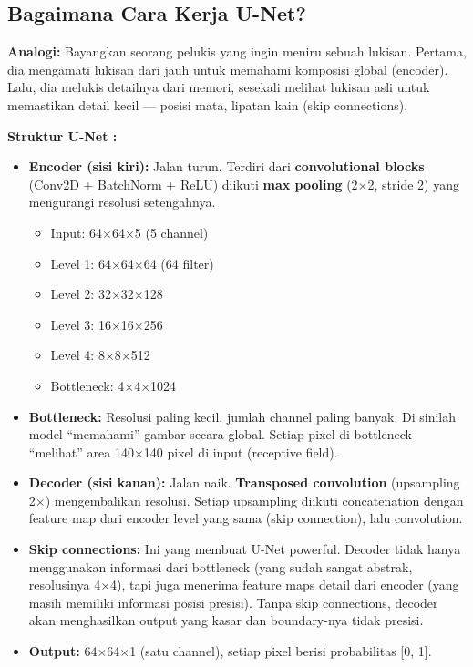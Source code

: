 \documentclass[10pt,a4paper,onecolumn]{article}
\begin{document}
\subsection{Bagaimana Cara Kerja U-Net?}

\textbf{Analogi:} Bayangkan seorang pelukis yang ingin meniru sebuah
lukisan. Pertama, dia mengamati lukisan dari jauh untuk memahami
komposisi global (encoder). Lalu, dia melukis detailnya dari memori,
sesekali melihat lukisan asli untuk memastikan detail kecil — posisi
mata, lipatan kain (skip connections).

\textbf{Struktur U-Net \cite{ronneberger2015unet}:}

\begin{itemize}[nosep]
    \item \textbf{Encoder (sisi kiri):} Jalan turun. Terdiri dari
          \textbf{convolutional blocks} (Conv2D + BatchNorm + ReLU)
          diikuti \textbf{max pooling} (2$\times$2, stride 2) yang
          mengurangi resolusi setengahnya.
    \begin{itemize}[nosep]
        \item Input: 64$\times$64$\times$5 (5 channel)
        \item Level 1: 64$\times$64$\times$64 (64 filter)
        \item Level 2: 32$\times$32$\times$128
        \item Level 3: 16$\times$16$\times$256
        \item Level 4: 8$\times$8$\times$512
        \item Bottleneck: 4$\times$4$\times$1024
    \end{itemize}
    \item \textbf{Bottleneck:} Resolusi paling kecil, jumlah channel
          paling banyak. Di sinilah model ``memahami'' gambar secara
          global. Setiap pixel di bottleneck ``melihat'' area
          140$\times$140 pixel di input (receptive field).
    \item \textbf{Decoder (sisi kanan):} Jalan naik. \textbf{Transposed
          convolution} (upsampling 2$\times$) mengembalikan resolusi.
          Setiap upsampling diikuti concatenation dengan feature map
          dari encoder level yang sama (skip connection), lalu
          convolution.
    \item \textbf{Skip connections:} Ini yang membuat U-Net powerful.
          Decoder tidak hanya menggunakan informasi dari bottleneck
          (yang sudah sangat abstrak, resolusinya 4$\times$4), tapi
          juga menerima feature maps detail dari encoder (yang masih
          memiliki informasi posisi presisi). Tanpa skip connections,
          decoder akan menghasilkan output yang kasar dan
          boundary-nya tidak presisi.
    \item \textbf{Output:} 64$\times$64$\times$1 (satu channel),
          setiap pixel berisi probabilitas [0, 1].
\end{itemize}
\end{document}
